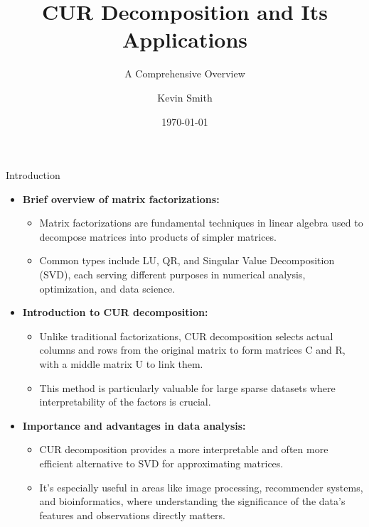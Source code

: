 \documentclass[pdf]
{beamer}
\title{CUR Decomposition and Its Applications}
\subtitle{A Comprehensive Overview}
\author{Kevin Smith}
\date{\today}
\begin{document}
\begin{frame}
    \titlepage
\end{frame}

\begin{frame}{Introduction}
    \begin{itemize}
        \item \textbf{Brief overview of matrix factorizations:}
            \begin{itemize}
                \item Matrix factorizations are fundamental techniques in linear algebra used to decompose matrices into products of simpler matrices.
                \item Common types include LU, QR, and Singular Value Decomposition (SVD), each serving different purposes in numerical analysis, optimization, and data science.
            \end{itemize}
        \item \textbf{Introduction to CUR decomposition:}
            \begin{itemize}
                \item Unlike traditional factorizations, CUR decomposition selects actual columns and rows from the original matrix to form matrices C and R, with a middle matrix U to link them.
                \item This method is particularly valuable for large sparse datasets where interpretability of the factors is crucial.
            \end{itemize}
        \item \textbf{Importance and advantages in data analysis:}
            \begin{itemize}
                \item CUR decomposition provides a more interpretable and often more efficient alternative to SVD for approximating matrices.
                \item It's especially useful in areas like image processing, recommender systems, and bioinformatics, where understanding the significance of the data's features and observations directly matters.
            \end{itemize}
    \end{itemize}
\end{frame}
\end{document}
